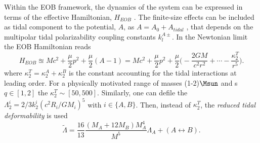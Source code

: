 Within the \ac{EOB} framework, the dynamics of the system can be expressed in terms of the 
effective Hamiltonian, $H_{EOB}$
%
.
The finite-size effects can be included as tidal component to the potential, $A$, as 
$A = A_0 + A_{tidal}$ \cite{Bini:2012gu}, 
that depends on the multipolar tidal polarizability coupling constants $k_{l}^{A\pm}$.
%
In the Newtonian limit the \ac{EOB} Hamiltonian reads 
%
\begin{equation}
H_{EOB} \approxeq Mc^2 + \frac{\mu}{2}p^2 + \frac{\mu}{2}(A-1) = Mc^2 + \frac{\mu}{2}p^2 + \frac{\mu}{2}\Big( -\frac{2 G M}{c^2 r^2} + \cdots - \frac{\kappa_2^T}{r^5} \Big).
\end{equation}
%
where $\kappa_2^T = \kappa_2^A + \kappa_2^B$ is the constant accounting for the tidal 
interactions at leading order.
%
For a physically motivated range of masses (1-2)$\Msun$ and \mr{}s $q\in[1,2]$ the 
$\kappa_2^T\sim[50,500]$. 
%
Similarly, one can defile the $\Lambda_2^i = 2/3 k_2^i (c^2 R_i/GM_i)^5$ with $i\in\{A,B\}$.
Then, instead of $\kappa_2^T$, the \textit{reduced tidal deformability} is used
%
\begin{equation}
\label{eq:theory:Lambda}
\tilde{\Lambda} = \frac{16}{13}\frac{(M_A + 12M_B)M_A^4}{M^5}\Lambda_A + (A\leftrightarrow B).
\end{equation}
%

